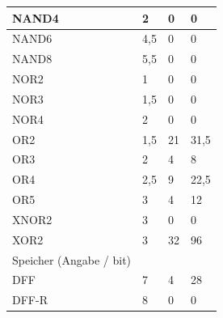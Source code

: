 \documentclass[11pt]{report}
\begin{document}
\begin{table}[h]
\begin{tabular}{llll}
			\multicolumn{1}{|l|}{NAND4}                  & \multicolumn{1}{l|}{2}     & \multicolumn{1}{l|}{0}  & \multicolumn{1}{l|}{0}     \\ \hline
			\multicolumn{1}{|l|}{NAND6}                  & \multicolumn{1}{l|}{4,5}   & \multicolumn{1}{l|}{0}  & \multicolumn{1}{l|}{0}     \\ \hline
			\multicolumn{1}{|l|}{NAND8}                  & \multicolumn{1}{l|}{5,5}   & \multicolumn{1}{l|}{0}  & \multicolumn{1}{l|}{0}     \\ \hline
			\multicolumn{1}{|l|}{NOR2}                   & \multicolumn{1}{l|}{1}     & \multicolumn{1}{l|}{0}  & \multicolumn{1}{l|}{0}     \\ \hline
			\multicolumn{1}{|l|}{NOR3}                   & \multicolumn{1}{l|}{1,5}   & \multicolumn{1}{l|}{0}  & \multicolumn{1}{l|}{0}     \\ \hline
			\multicolumn{1}{|l|}{NOR4}                   & \multicolumn{1}{l|}{2}     & \multicolumn{1}{l|}{0}  & \multicolumn{1}{l|}{0}     \\ \hline
			\multicolumn{1}{|l|}{OR2}                    & \multicolumn{1}{l|}{1,5}   & \multicolumn{1}{l|}{21} & \multicolumn{1}{l|}{31,5}  \\ \hline
			\multicolumn{1}{|l|}{OR3}                    & \multicolumn{1}{l|}{2}     & \multicolumn{1}{l|}{4}  & \multicolumn{1}{l|}{8}     \\ \hline
			\multicolumn{1}{|l|}{OR4}                    & \multicolumn{1}{l|}{2,5}   & \multicolumn{1}{l|}{9}  & \multicolumn{1}{l|}{22,5}  \\ \hline
			\multicolumn{1}{|l|}{OR5}                    & \multicolumn{1}{l|}{3}     & \multicolumn{1}{l|}{4}  & \multicolumn{1}{l|}{12}    \\ \hline
			\multicolumn{1}{|l|}{XNOR2}                  & \multicolumn{1}{l|}{3}     & \multicolumn{1}{l|}{0}  & \multicolumn{1}{l|}{0}     \\ \hline
			\multicolumn{1}{|l|}{XOR2}                   & \multicolumn{1}{l|}{3}     & \multicolumn{1}{l|}{32} & \multicolumn{1}{l|}{96}    \\ \hline
			\multicolumn{1}{|l}{Speicher (Angabe / bit)} &                            &                         & \multicolumn{1}{l|}{}      \\ \hline
			\multicolumn{1}{|l|}{DFF}                    & \multicolumn{1}{l|}{7}     & \multicolumn{1}{l|}{4}  & \multicolumn{1}{l|}{28}    \\ \hline
			\multicolumn{1}{|l|}{DFF-R}                  & \multicolumn{1}{l|}{8}     & \multicolumn{1}{l|}{0}  & \multicolumn{1}{l|}{0}     \\ \hline

\end{tabular}
\end{table}
\end{document}
